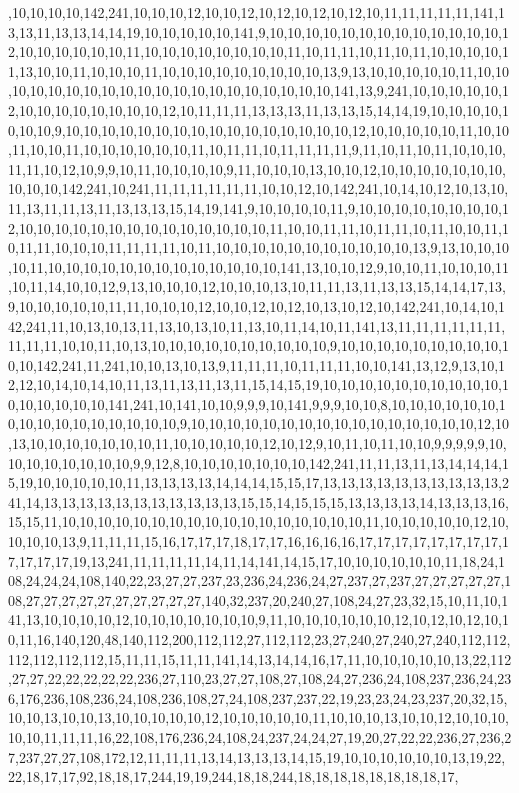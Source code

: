 ,10,10,10,10,142,241,10,10,10,12,10,10,12,10,12,10,12,10,12,10,11,11,11,11,11,141,13,13,11,13,13,14,14,19,10,10,10,10,10,141,9,10,10,10,10,10,10,10,10,10,10,10,10,10,12,10,10,10,10,10,10,11,10,10,10,10,10,10,10,10,11,10,11,11,10,11,10,11,10,10,10,10,11,13,10,10,11,10,10,10,11,10,10,10,10,10,10,10,10,10,13,9,13,10,10,10,10,10,11,10,10,10,10,10,10,10,10,10,10,10,10,10,10,10,10,10,10,10,10,141,13,9,241,10,10,10,10,10,12,10,10,10,10,10,10,10,10,12,10,11,11,11,13,13,13,11,13,13,15,14,14,19,10,10,10,10,10,10,10,9,10,10,10,10,10,10,10,10,10,10,10,10,10,10,10,10,12,10,10,10,10,10,11,10,10,11,10,10,11,10,10,10,10,10,10,11,10,11,11,10,11,11,11,11,9,11,10,11,10,11,10,10,10,11,11,10,12,10,9,9,10,11,10,10,10,10,9,11,10,10,10,13,10,10,12,10,10,10,10,10,10,10,10,10,10,142,241,10,241,11,11,11,11,11,11,10,10,12,10,142,241,10,14,10,12,10,13,10,11,13,11,11,13,11,13,13,13,15,14,19,141,9,10,10,10,10,11,9,10,10,10,10,10,10,10,10,12,10,10,10,10,10,10,10,10,10,10,10,10,10,10,11,10,10,11,11,10,11,11,10,11,10,10,11,10,11,11,10,10,10,11,11,11,11,10,11,10,10,10,10,10,10,10,10,10,10,10,13,9,13,10,10,10,10,11,10,10,10,10,10,10,10,10,10,10,10,10,10,141,13,10,10,12,9,10,10,11,10,10,10,11,10,11,14,10,10,12,9,13,10,10,10,12,10,10,10,13,10,11,11,13,11,13,13,15,14,14,17,13,9,10,10,10,10,10,11,11,10,10,10,12,10,10,12,10,12,10,13,10,12,10,142,241,10,14,10,142,241,11,10,13,10,13,11,13,10,13,10,11,13,10,11,14,10,11,141,13,11,11,11,11,11,11,11,11,11,10,10,11,10,13,10,10,10,10,10,10,10,10,10,10,9,10,10,10,10,10,10,10,10,10,10,10,142,241,11,241,10,10,13,10,13,9,11,11,11,10,11,11,11,10,10,141,13,12,9,13,10,12,12,10,14,10,14,10,11,13,11,13,11,13,11,15,14,15,19,10,10,10,10,10,10,10,10,10,10,10,10,10,10,10,10,141,241,10,141,10,10,9,9,9,10,141,9,9,9,10,10,8,10,10,10,10,10,10,10,10,10,10,10,10,10,10,10,10,9,10,10,10,10,10,10,10,10,10,10,10,10,10,10,10,10,12,10,13,10,10,10,10,10,10,10,11,10,10,10,10,10,12,10,12,9,10,11,10,11,10,10,9,9,9,9,9,10,10,10,10,10,10,10,10,9,9,12,8,10,10,10,10,10,10,10,142,241,11,11,13,11,13,14,14,14,15,19,10,10,10,10,10,11,13,13,13,13,14,14,14,15,15,17,13,13,13,13,13,13,13,13,13,13,241,14,13,13,13,13,13,13,13,13,13,13,13,15,15,14,15,15,15,13,13,13,13,14,13,13,13,16,15,15,11,10,10,10,10,10,10,10,10,10,10,10,10,10,10,10,10,10,11,10,10,10,10,10,12,10,10,10,10,13,9,11,11,11,15,16,17,17,17,18,17,17,16,16,16,16,17,17,17,17,17,17,17,17,17,17,17,17,19,13,241,11,11,11,11,14,11,14,141,14,15,17,10,10,10,10,10,10,11,18,24,108,24,24,24,108,140,22,23,27,27,237,23,236,24,236,24,27,237,27,237,27,27,27,27,27,108,27,27,27,27,27,27,27,27,27,27,140,32,237,20,240,27,108,24,27,23,32,15,10,11,10,141,13,10,10,10,10,12,10,10,10,10,10,10,10,9,11,10,10,10,10,10,10,12,10,12,10,12,10,10,11,16,140,120,48,140,112,200,112,112,27,112,112,23,27,240,27,240,27,240,112,112,112,112,112,112,15,11,11,15,11,11,141,14,13,14,14,16,17,11,10,10,10,10,10,13,22,112,27,27,22,22,22,22,22,236,27,110,23,27,27,108,27,108,24,27,236,24,108,237,236,24,236,176,236,108,236,24,108,236,108,27,24,108,237,237,22,19,23,23,24,23,237,20,32,15,10,10,13,10,10,13,10,10,10,10,10,12,10,10,10,10,10,11,10,10,10,13,10,10,12,10,10,10,10,10,11,11,11,16,22,108,176,236,24,108,24,237,24,24,27,19,20,27,22,22,236,27,236,27,237,27,27,108,172,12,11,11,11,13,14,13,13,13,14,15,19,10,10,10,10,10,10,13,19,22,22,18,17,17,92,18,18,17,244,19,19,244,18,18,244,18,18,18,18,18,18,18,18,17,
